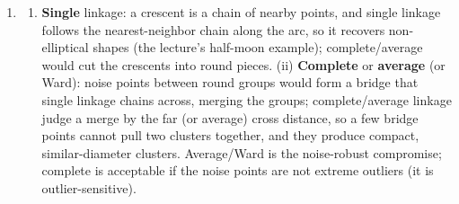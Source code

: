 \documentclass[
  11pt,
]{article}
\providecommand{\tightlist}{%
  \setlength{\itemsep}{0pt}\setlength{\parskip}{0pt}}
\begin{document}
\begin{solutionbox}
\begin{enumerate}
  the ends are far apart (\(d(A,D)=9\)) --- chaining. Complete linkage
  charges a merge the \emph{farthest} cross pair, i.e.~the diameter of
  the merged group, so pulling C into \(\{AB\}\) costs 5 while pairing C
  with D costs 4; it keeps groups compact and only merges the two
  compact groups at the end, at 12.
\item
  \begin{enumerate}
  \def\labelenumii{(\roman{enumii})}
  \tightlist
  \item
    \textbf{Single} linkage: a crescent is a chain of nearby points, and
    single linkage follows the nearest-neighbor chain along the arc, so
    it recovers non-elliptical shapes (the lecture's half-moon example);
    complete/average would cut the crescents into round pieces. (ii)
    \textbf{Complete} or \textbf{average} (or Ward): noise points
    between round groups would form a bridge that single linkage chains
    across, merging the groups; complete/average linkage judge a merge
    by the far (or average) cross distance, so a few bridge points
    cannot pull two clusters together, and they produce compact,
    similar-diameter clusters. Average/Ward is the noise-robust
    compromise; complete is acceptable if the noise points are not
    extreme outliers (it is outlier-sensitive).
  \end{enumerate}
\end{enumerate}

\end{solutionbox}
\end{document}
